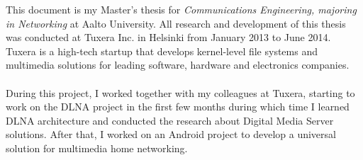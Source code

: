 
This document is my Master's thesis for \textit{Communications Engineering, majoring in
Networking} at Aalto University. All research and development of this thesis was
conducted at Tuxera Inc. in Helsinki from January 2013 to June 2014. Tuxera is a
high-tech startup that develops kernel-level file systems and multimedia solutions
for leading software, hardware and electronics companies.\\
\\
During this project, I worked together with my colleagues at Tuxera, starting
to work on the DLNA project in the first few months during which time I learned
DLNA architecture and conducted the research about Digital Media Server solutions.
After that, I worked on an Android project to develop a universal solution for
multimedia home networking.